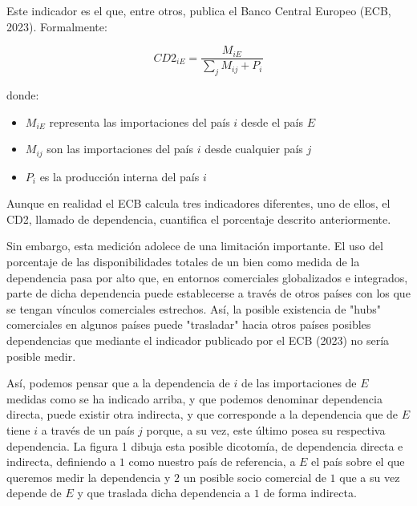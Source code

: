 \documentclass[5p,authoryear]{elsarticle}
\begin{document}
Este indicador es el que, entre otros, publica el Banco Central Europeo (ECB, 2023). Formalmente:

\begin{equation}
    CD2_{iE} = \frac{M_{iE}}{\sum_{j} M_{ij} + P_i}
\end{equation}

donde:
\begin{itemize}
    \item $M_{iE}$ representa las importaciones del país $i$ desde el país $E$
    \item $M_{ij}$ son las importaciones del país $i$ desde cualquier país $j$
    \item $P_i$ es la producción interna del país $i$
\end{itemize}

Aunque en realidad el ECB calcula tres indicadores diferentes, uno de ellos, el CD2, llamado de dependencia, cuantifica el porcentaje descrito anteriormente. 

Sin embargo, esta medición adolece de una limitación importante. El uso del porcentaje de las disponibilidades totales de un bien como medida de la dependencia pasa por alto que, en entornos comerciales globalizados e integrados, parte de dicha dependencia puede establecerse a través de otros países con los que se tengan vínculos comerciales estrechos. Así, la posible existencia de "hubs" comerciales en algunos países puede "trasladar" hacia otros países posibles dependencias que mediante el indicador publicado por el ECB (2023) no sería posible medir.

Así, podemos pensar que a la dependencia de $i$ de las importaciones de $E$ medidas como se ha indicado arriba, y que podemos denominar dependencia directa, puede existir otra indirecta, y que corresponde a la dependencia que de $E$ tiene $i$ a través de un país $j$ porque, a su vez, este último posea su respectiva dependencia. La figura 1 dibuja esta posible dicotomía, de dependencia directa e indirecta, definiendo a $1$ como nuestro país de referencia, a $E$ el país sobre el que queremos medir la dependencia y $2$ un posible socio comercial de $1$ que a su vez depende de $E$ y que traslada dicha dependencia a $1$ de forma indirecta.
\end{document}

